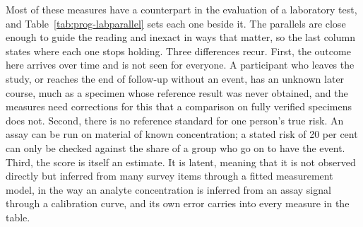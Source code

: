 Most of these measures have a counterpart in the evaluation of a laboratory test, and Table~\ref{tab:prog-labparallel} sets each one beside it. The parallels are close enough to guide the reading and inexact in ways that matter, so the last column states where each one stops holding. Three differences recur. First, the outcome here arrives over time and is not seen for everyone. A participant who leaves the study, or reaches the end of follow-up without an event, has an unknown later course, much as a specimen whose reference result was never obtained, and the measures need corrections for this that a comparison on fully verified specimens does not. Second, there is no reference standard for one person's true risk. An assay can be run on material of known concentration; a stated risk of 20 per cent can only be checked against the share of a group who go on to have the event. Third, the score is itself an estimate. It is latent, meaning that it is not observed directly but inferred from many survey items through a fitted measurement model, in the way an analyte concentration is inferred from an assay signal through a calibration curve, and its own error carries into every measure in the table.

